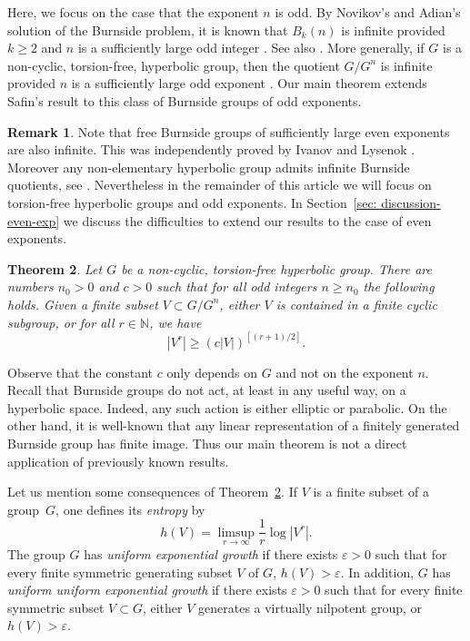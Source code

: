 \documentclass[JEP,XML,SOM,Unicode, NoEqCountersInSection,published]{cedram}
\theoremstyle{plain}
\newtheorem{thm}{Theorem}[section]
\theoremstyle{definition}
\newtheorem{rem}[thm]{Remark}
\begin{document}
Here, we focus on the case that the exponent $n$ is odd.
By Novikov's and Adian's solution of the Burnside problem, it is known that $B_k(n)$ is infinite provided $k \geq 2$ and $n$ is a sufficiently large odd integer \cite{adian_burnside_1979}. See also \cite{olshanksii_novikov_1982,delzant_courbure_2008}.
More generally, if $G$ is a non-cyclic, torsion-free, hyperbolic group, then the quotient $G/G^n$ is infinite provided $n$ is a sufficiently large odd exponent \cite{olshanskii_periodic_1991,delzant_courbure_2008}.
Our main theorem extends Safin's result to this class of Burnside groups of odd exponents.

\begin{rem}
Note that free Burnside groups of sufficiently large even exponents are also infinite.
This was independently proved by Ivanov \cite{Ivanov:1994kh} and Lysenok \cite{Lysenok:1996kw}.
Moreover any non-elementary hyperbolic group admits infinite Burnside quotients, see \cite{Ivanov:1996va,coulon_infinite_2018}.
Nevertheless in the remainder of this article we will focus on torsion-free hyperbolic groups and odd exponents.
In Section~\ref{sec: discussion-even-exp} we discuss the difficulties to extend our results to the case of even exponents.
\end{rem}

\begin{thm}\label{T: intro - large powers free burnside}
Let $G$ be a non-cyclic, torsion-free hyperbolic group.
There are numbers $n_0>0$ and $c >0$ such that for all odd integers $n\geqslant n_0$ the following holds.
Given a finite subset $V \subset G/G^n$, either $V$ is contained in a finite cyclic subgroup, or for all $r\in \mathbb N$, we have
\[
|V^r|\geqslant \left( c |V| \right)^{[(r+1)/2]}.
\]
\end{thm}

Observe that the constant $c$ only depends on $G$ and not on the exponent $n$.
Recall that Burnside groups do not act, at least in any useful way, on a hyperbolic space.
Indeed, any such action is either elliptic or parabolic.
On the other hand, it is well-known that any linear representation of a finitely generated Burnside group has finite image.
Thus our main theorem is not a direct application of previously known results.

Let us mention some consequences of Theorem~\ref{T: intro - large powers free burnside}.
If $V$ is a finite subset of a group~$G$, one defines its \emph{entropy} by
\begin{equation*}
h(V)= \limsup_{r \to \infty} \frac{1}{r}\log |V^r|.
\end{equation*}
The group $G$ has \emph{uniform exponential growth} if there exists $\varepsilon > 0$ such that for every finite symmetric generating subset $V$ of $G$, $h(V) > \varepsilon$.
In addition, $G$ has \emph{uniform uniform exponential growth} if there exists $\varepsilon > 0$ such that for every finite symmetric subset $V \subset G$, either $V$ generates a virtually nilpotent group, or $h(V) > \varepsilon$.
\end{document}
